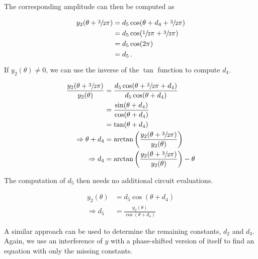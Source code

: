 The corresponding amplitude can then be computed as

\begin{equation}
    \label{eq:whateverman2}
    \begin{split}
        y_2(\theta + \sfrac32\pi)
            &= d_5 \cos(\theta + d_4 + \sfrac32\pi)\\
            &= d_5 \cos(\sfrac12\pi + \sfrac32\pi)\\
            &= d_5 \cos(2\pi)\\
            &= d_5\,.
    \end{split}
\end{equation}

If $y_2(\theta) \neq 0$, we can use the inverse of the $\tan$ function to
compute $d_4$.

\begin{equation}
    \label{eq:d4}
    \begin{split}
        \frac{y_2(\theta + \sfrac32 \pi)}{y_2(\theta)}
            &= \frac{d_5 \cos(\theta + \sfrac32 \pi + d_4)}{d_5 \cos(\theta + d_4)} \\
            &= \frac{\sin(\theta + d_4)}{\cos(\theta + d_4)} \\
            &= \tan(\theta + d_4) \\
        \Rightarrow \theta + d_4
            &= \arctan\left(\frac{y_2(\theta + \sfrac32 \pi)}{y_2(\theta)}\right) \\
        \Rightarrow d_4
            &= \arctan\left(\frac{y_2(\theta + \sfrac32 \pi)}{y_2(\theta)}\right) - \theta
    \end{split}
\end{equation}

The computation of $d_5$ then needs no additional circuit evaluations.

\begin{equation}
    \label{eq:d5}
    \begin{split}
        y_2(\theta)
            &= d_5 \cos(\theta + d_4) \\
        \Rightarrow d_5
            &= \frac{y_2(\theta)}{\cos(\theta + d_4)}
    \end{split}
\end{equation}

A similar approach can be used to determine the remaining constants, $d_2$ and
$d_3$.
Again, we use an interference of $y$ with a phase-shifted version of itself to
find an equation with only the missing constants.

